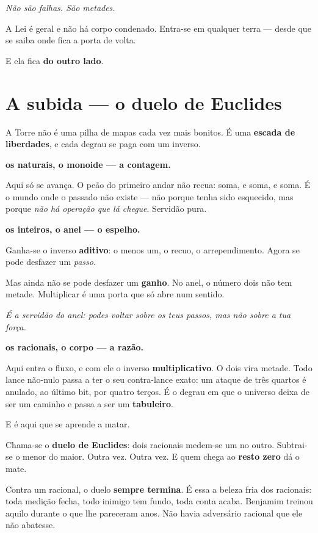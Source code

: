 \documentclass[livro.tex]{subfiles}
\begin{document}
\emph{Não são falhas. São metades.}

A Lei é geral e não há corpo condenado. Entra-se em qualquer terra --- desde que se saiba onde fica a porta de
volta.

E ela fica \textbf{do outro lado}.


\chapter{A subida --- o duelo de Euclides}

A Torre não é uma pilha de mapas cada vez mais bonitos. É uma \textbf{escada de liberdades}, e cada degrau se paga
com um inverso.

\medskip\noindent\textbf{os naturais, o monoide --- a contagem.}

Aqui só se avança. O peão do primeiro andar não recua: soma, e soma, e soma. É o mundo onde o passado não existe
--- não porque tenha sido esquecido, mas porque \emph{não há operação que lá chegue}. Servidão pura.

\medskip\noindent\textbf{os inteiros, o anel --- o espelho.}

Ganha-se o inverso \textbf{aditivo}: o menos um, o recuo, o arrependimento. Agora se pode desfazer um \emph{passo}.

Mas ainda não se pode desfazer um \textbf{ganho}. No anel, o número dois não tem metade. Multiplicar é uma porta que
só abre num sentido.

\emph{É a servidão do anel: podes voltar sobre os teus passos, mas não sobre a tua força.}

\medskip\noindent\textbf{os racionais, o corpo --- a razão.}

Aqui entra o fluxo, e com ele o inverso \textbf{multiplicativo}. O dois vira metade. Todo lance não-nulo passa a
ter o seu contra-lance exato: um ataque de três quartos é anulado, ao último bit, por quatro terços. É o degrau em que o
universo deixa de ser um caminho e passa a ser um \textbf{tabuleiro}.

E é aqui que se aprende a matar.

Chama-se o \textbf{duelo de Euclides}: dois racionais medem-se um no outro. Subtrai-se o menor do maior. Outra vez.
Outra vez. E quem chega ao \textbf{resto zero} dá o mate.

Contra um racional, o duelo \textbf{sempre termina}. É essa a beleza fria dos racionais: toda medição fecha, todo inimigo
tem fundo, toda conta acaba. Benjamim treinou aquilo durante o que lhe pareceram anos. Não havia adversário racional
que ele não abatesse.
\end{document}
